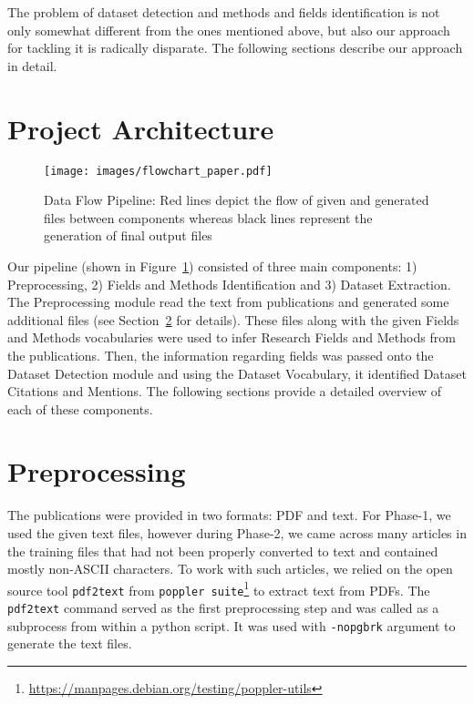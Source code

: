 \documentclass[runningheads]{llncs}
\begin{document}
	The problem of dataset detection and methods and fields identification is not only somewhat different from the ones mentioned above, but also our approach for tackling it is radically disparate. The following sections describe our approach in detail.
	
	\section{Project Architecture}
	
	\begin{figure}[!htb]
		\centering
		\texttt{[image: images/flowchart\_paper.pdf]}
		\caption{Data Flow Pipeline: Red lines depict the flow of given and generated files between components whereas black lines represent the generation of final output files}
		\label{fig:flowchart}
	\end{figure}
	
	Our pipeline (shown in Figure~\ref{fig:flowchart}) consisted of three main components: 1) Preprocessing, 2) Fields and Methods Identification and 3) Dataset Extraction. The Preprocessing module read the text from publications and generated some additional files (see Section~\ref{preprocess} for details). These files along with the given Fields and Methods vocabularies were used to infer Research Fields and Methods from the publications. Then, the information regarding fields was passed onto the Dataset Detection module and using the Dataset Vocabulary, it identified Dataset Citations and Mentions. The following sections provide a detailed overview of each of these components. 
	
	\section{Preprocessing} \label{preprocess}
	
	The publications were provided in two formats: PDF and text. %
	For Phase-1, we used the given text files, however during Phase-2, we came across many articles in the training files that had not been properly converted to text and contained mostly non-ASCII characters. To work with such articles, we relied on the open source tool \texttt{pdf2text} from \texttt{poppler suite}\footnote{\label{poppler}\url{https://manpages.debian.org/testing/poppler-utils}} to extract text from PDFs. The \texttt{pdf2text} command served as the first preprocessing step and was called as a subprocess from within a python script. It was used with \texttt{-nopgbrk} argument to generate the text files. 
	
\end{document}
